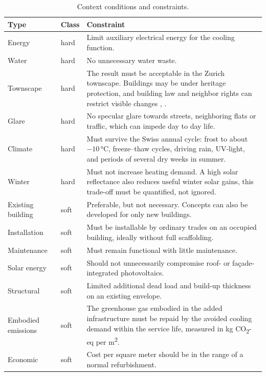 \begin{table}[H]
\centering\small
\caption{Context conditions and constraints.}
\label{tab:constraints}
\renewcommand{\arraystretch}{1.2}
\begin{tabularx}{\textwidth}{L{3.0cm} L{1.2cm} Y}
\toprule
\textbf{Type} & \textbf{Class} & \textbf{Constraint} \\
\midrule
Energy & hard & Limit auxiliary electrical energy for the cooling function. \\
Water & hard & No unnecessary water waste. \\
Townscape & hard & The result must be acceptable in the Zurich townscape. Buildings may be under heritage protection, and building law and neighbor rights can restrict visible changes \cite{stadtzuerich_web}, \cite[p.~128]{stadtzuerich2020}. \\
Glare & hard & No specular glare towards streets, neighboring flats or traffic, which can impede day to day life. \\
Climate & hard & Must survive the Swiss annual cycle: frost to about $-10$\,°C, freeze--thaw cycles, driving rain, UV-light, and periods of several dry weeks in summer. \\
Winter & hard & Must not increase heating demand. A high solar reflectance also reduces useful winter solar gains, this trade-off must be quantified, not ignored. \\
Existing building & soft & Preferable, but not necessary. Concepts can also be developed for only new buildings. \\
Installation & soft & Must be installable by ordinary trades on an occupied building, ideally without full scaffolding. \\
Maintenance & soft & Must remain functional with little maintenance. \\
Solar energy & soft & Should not unnecessarily compromise roof- or façade-integrated photovoltaics. \\
Structural & soft & Limited additional dead load and build-up thickness on an existing envelope. \\
Embodied emissions & soft & The greenhouse gas embodied in the added infrastructure must be repaid by the avoided cooling demand within the service life, measured in kg CO\textsubscript{2}-eq per m\textsuperscript{2}. \\
Economic & soft & Cost per square meter should be in the range of a normal refurbishment. \\
\bottomrule
\end{tabularx}
\end{table}

